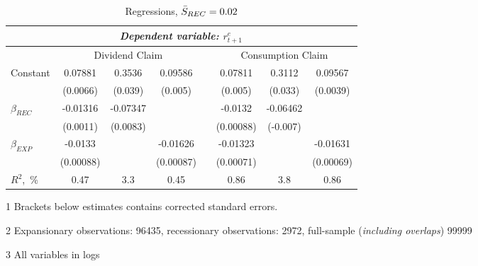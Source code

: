 \begin{table}[H]
\centering
\caption{Regressions, $\Bar{S}_{REC} = 0.02$}  
\label{tabregress2}
\begin{threeparttable}
\begin{tabular}{@{}lccccccc@{}}
\toprule
& \multicolumn{6}{c}{\textit{Dependent variable: $r^{e}_{t+1}$}} \\ 
\midrule
& \multicolumn{3}{c}{Dividend Claim} && \multicolumn{3}{c}{Consumption Claim} \\
\cmidrule(lr){2-4} \cmidrule(lr){6-8}
Constant & 0.07881  & 0.3536  & 0.09586 && 0.07811 & 0.3112 & 0.09567 \\
         & (0.0066) & (0.039) & (0.005) &&(0.005) & (0.033)& (0.0039)\\
\addlinespace
$\beta_{REC}$ &-0.01316  & -0.07347 &&& -0.0132    & -0.06462 & \\
              & (0.0011) & (0.0083)  &&& (0.00088) & (-0.007) & \\
\addlinespace 
$\beta_{EXP}$ & -0.0133 & & -0.01626   && -0.01323  && -0.01631\\
              & (0.00088) & & (0.00087)&& (0.00071) && (0.00069)\\
\addlinespace
\midrule
$R^2$,~\%         & 0.47 & 3.3 & 0.45 & & 0.86 & 3.8 & 0.86 \\
\bottomrule
\end{tabular}
\begin{tablenotes}\footnotesize{
\item[1] Brackets below estimates contains \citet{NW87} corrected standard errors. 
\item[2] Expansionary observations: 96435, recessionary observations: 2972, full-sample (\textit{including overlaps}) 99999
\item[3] All variables in logs}
\end{tablenotes}
\end{threeparttable}
\end{table}


